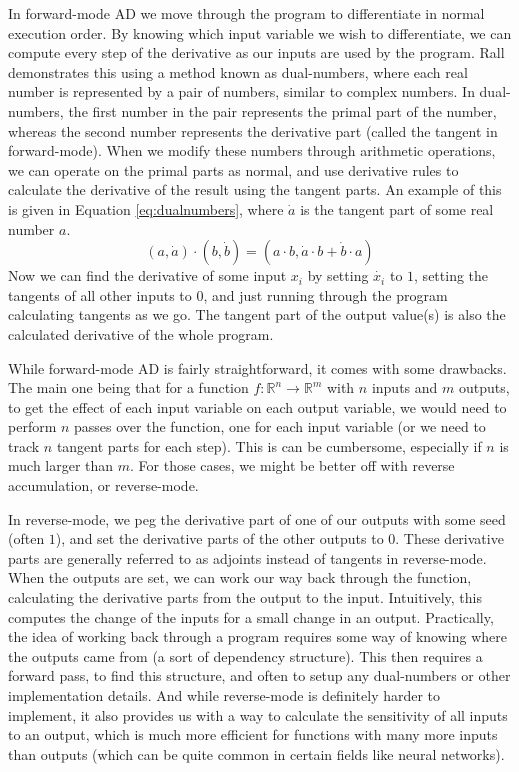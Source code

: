         In forward-mode AD we move through the program to differentiate in normal execution order.
        By knowing which input variable we wish to differentiate, we can compute every step of the derivative as our inputs are used by the program.
        Rall demonstrates this using a method known as dual-numbers, where each real number is represented by a pair of numbers, similar to complex numbers.
        In dual-numbers, the first number in the pair represents the primal part of the number, whereas the second number represents the derivative part (called the tangent in forward-mode).
        When we modify these numbers through arithmetic operations, we can operate on the primal parts as normal, and use derivative rules to calculate the derivative of the result using the tangent parts.
        An example of this is given in Equation \ref{eq:dualnumbers}, where $\dot{a}$ is the tangent part of some real number $a$.
        \begin{equation} \label{eq:dualnumbers}
            (a,\dot{a})\cdot(b,\dot{b})=(a\cdot b, \dot{a}\cdot b+\dot{b}\cdot a)
        \end{equation}
        Now we can find the derivative of some input $x_i$ by setting $\dot{x_i}$ to $1$, setting the tangents of all other inputs to $0$, and just running through the program calculating tangents as we go.
        The tangent part of the output value(s) is also the calculated derivative of the whole program.

        While forward-mode AD is fairly straightforward, it comes with some drawbacks.
        The main one being that for a function $f:\mathbb{R}^n\to\mathbb{R}^m$ with $n$ inputs and $m$ outputs, to get the effect of each input variable on each output variable, we would need to perform $n$ passes over the function, one for each input variable (or we need to track $n$ tangent parts for each step).
        This is can be cumbersome, especially if $n$ is much larger than $m$.
        For those cases, we might be better off with reverse accumulation, or reverse-mode.

        In reverse-mode, we peg the derivative part of one of our outputs with some seed (often $1$), and set the derivative parts of the other outputs to $0$.
        These derivative parts are generally referred to as adjoints instead of tangents in reverse-mode.
        When the outputs are set, we can work our way back through the function, calculating the derivative parts from the output to the input.
        Intuitively, this computes the change of the inputs for a small change in an output.
        Practically, the idea of working back through a program requires some way of knowing where the outputs came from (a sort of dependency structure).
        This then requires a forward pass, to find this structure, and often to setup any dual-numbers or other implementation details.
        And while reverse-mode is definitely harder to implement, it also provides us with a way to calculate the sensitivity of all inputs to an output, which is much more efficient for functions with many more inputs than outputs (which can be quite common in certain fields like neural networks).

